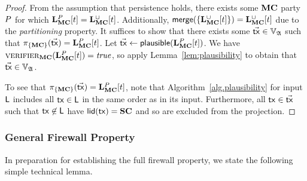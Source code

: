 \begin{proof}
  From the assumption that persistence holds, there exists some $\mathbf{MC}$ party
  $P$
  for which $\mathbf{L}_{\mathbf{MC}}^P[t] = \mathbf{L}_{\mathbf{MC}}^{\cup}[t]$.
  Additionally, $\mathsf{merge}(\{\mathbf{L}_{\mathbf{MC}}^{\cup}[t]\}) = \mathbf{L}_{\mathbf{MC}}^{\cup}[t]$ due to the
  \emph{partitioning} property.
  It suffices to show that there exists some $\vec{\mathsf{tx}} \in \mathbb{V}_{\mathfrak{A}}$ such
  that $\pi_{\{\mathbf{MC}\}}(\vec{\mathsf{tx}}) = \mathbf{L}_{\mathbf{MC}}^{P}[t]$. Let
  $\vec{\mathsf{tx}} \gets \textsf{plausible}(\mathbf{L}_{\mathbf{MC}}^{P}[t])$. We have
  $\textsc{verifier}_{\mathbf{MC}}(\mathbf{L}_{\mathbf{MC}}^{P}[t]) = \text{\emph{true}}$, so apply
  Lemma~\ref{lem:plausibility} to obtain that $\vec{\mathsf{tx}} \in \mathbb{V}_{\mathfrak{A}}$.

  To see that $\pi_{\{\mathbf{MC}\}}(\vec{\mathsf{tx}}) = \mathbf{L}_{\mathbf{MC}}^{P}[t]$, note that
  Algorithm~\ref{alg.plausibility} for input $\mathsf{L}$ includes all $\mathsf{tx} \in \mathsf{L}$ in the
  same order as in its input. Furthermore, all $\mathsf{tx} \in \vec{\mathsf{tx}}$ such that $\mathsf{tx}
  \not\in \mathsf{L}$ have $\mathsf{lid}(\mathsf{tx}) = \mathbf{SC}$ and so are excluded from the projection.
\end{proof}

\subsubsection{General Firewall Property}

In preparation for establishing the full firewall property, we state the
following simple technical lemma.

